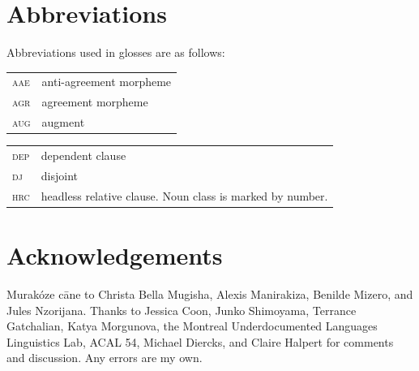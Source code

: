 \documentclass[output=paper,colorlinks,citecolor=brown
]{langscibook}
\begin{document}
\section*{Abbreviations}

Abbreviations used in glosses are as follows:

\begin{tabularx}{.45\textwidth}{lQ}
\textsc{aae} & anti-agreement morpheme\\
 \textsc{agr} & agreement morpheme\\
 \textsc{aug} & augment\\
 \end{tabularx}
\begin{tabularx}{.45\textwidth}{lQ}
 \textsc{dep} & dependent clause\\
 \textsc{dj} & disjoint\\
 \textsc{hrc} & headless relative clause. Noun class is marked by number.
\end{tabularx}

\section*{Acknowledgements}

Murakóze cāne to Christa Bella Mugisha, Alexis Manirakiza, Benilde Mizero, and Jules Nzorijana. Thanks to Jessica Coon, Junko Shimoyama, Terrance Gatchalian, Katya Morgunova, the Montreal Underdocumented Languages Linguistics Lab, ACAL 54, Michael Diercks, and Claire Halpert for comments and discussion. Any errors are my own.

\sloppy %

\printbibliography[heading=subbibliography,notkeyword=this]
\end{document}
